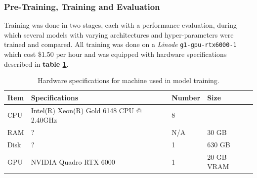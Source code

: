 \documentclass{article}
\begin{document}
\subsubsection{Pre-Training, Training and Evaluation}

Training was done in two stages, each with a performance evaluation, during which several models with varying architectures and hyper-parameters were trained and compared.
All training was done on a \textit{Linode} \texttt{g1-gpu-rtx6000-1} which cost \$1.50 per hour and was equipped with hardware specifications described in \textbf{table \ref{hardwaretable}}.

\begin{table}
	\begin{center}
		\caption{\label{hardwaretable} Hardware specifications for machine used in model training.}
		\begin{tabular}{l|p{3cm}|l|l}
			\textbf{Item} & \textbf{Specifications} & \textbf{Number}  & \textbf{Size}\\
		\hline 
		CPU  & Intel(R) Xeon(R) Gold 6148 CPU @ 2.40GHz & 8 \\
		RAM  & ?  & N/A & 30 GB \\
		Disk & ?  & 1   & 630 GB \\
		GPU  & NVIDIA Quadro RTX 6000 & 1 & 20 GB VRAM \\ 

	\end{tabular}
	\end{center}
\end{table}
\end{document}
